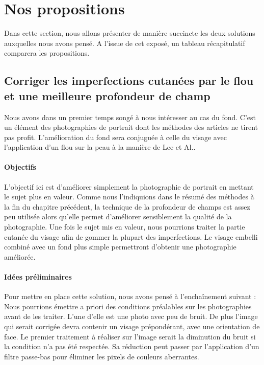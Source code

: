 \documentclass[11pt, french]{report-rd-info}
\begin{document}
\section{Nos propositions}
Dans cette section, nous allons présenter de manière succincte les deux solutions auxquelles nous avons pensé. A l’issue de cet exposé, un tableau récapitulatif comparera les propositions.
\subsection{Corriger les imperfections cutanées par le flou et une meilleure profondeur de champ}
\label{propun}
Nous avons dans un premier temps songé à nous intéresser au cas du fond. C’est un élément des photographies de portrait dont les méthodes des articles ne tirent pas profit. L’amélioration du fond sera conjuguée à celle du visage avec l’application d’un flou sur la peau à la manière de Lee et Al.\cite{Lee}.
\paragraph{Objectifs}
L’objectif ici est d’améliorer simplement la photographie de portrait en mettant le sujet plus en valeur. Comme nous l’indiquions dans le résumé des méthodes à la fin du chapitre précédent, la technique de la profondeur de champs est assez peu utilisée alors qu’elle permet d’améliorer sensiblement la qualité de la photographie. Une fois le sujet mis en valeur, nous pourrions traiter la partie cutanée du visage afin de gommer la plupart des imperfections. Le visage embelli combiné avec un fond plus simple permettront d’obtenir une photographie améliorée.
\paragraph{Idées préliminaires}
Pour mettre en place cette solution, nous avons pensé à l'enchaînement suivant :
Nous pourrions émettre a priori des conditions préalables sur les photographies avant de les traiter. L’une d’elle est une photo avec peu de bruit. De plus l’image qui serait corrigée devra contenir un visage prépondérant, avec une orientation de face.
Le premier traitement à réaliser sur l’image serait la diminution du bruit si la condition n’a pas été respectée. Sa réduction peut passer par l’application d’un filtre passe-bas pour éliminer les pixels de couleurs aberrantes.
\end{document}
